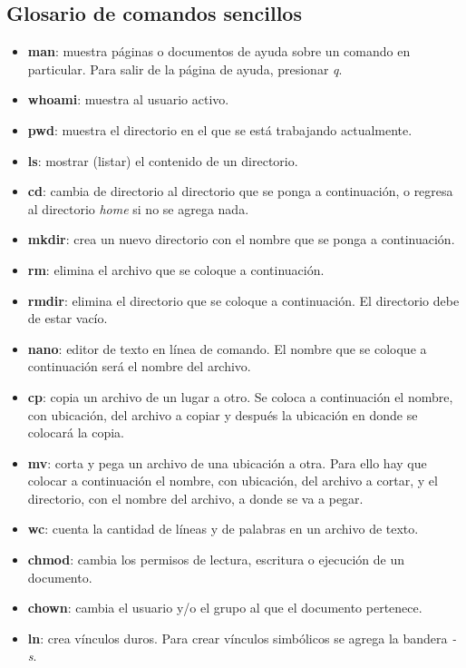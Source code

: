 \documentclass[10pt,letterpaper]{article}
\begin{document}
\subsection{Glosario de comandos sencillos}
\begin{small}

\begin{itemize}
\item \textbf{man}: muestra p\'aginas o documentos de ayuda sobre un comando en particular. Para salir de la p\'agina de ayuda, presionar \emph{q}.
\item \textbf{whoami}: muestra al usuario activo.
\item \textbf{pwd}: muestra el directorio en el que se est\'a trabajando actualmente.
\item \textbf{ls}: mostrar (listar) el contenido de un directorio.
\item \textbf{cd}: cambia de directorio al directorio que se ponga a continuaci\'on, o regresa al directorio \emph{home} si no se agrega nada.
\item \textbf{mkdir}: crea un nuevo directorio con el nombre que se ponga a continuaci\'on.
\item \textbf{rm}: elimina el archivo que se coloque a continuaci\'on.
\item \textbf{rmdir}: elimina el directorio que se coloque a continuaci\'on. El directorio debe de estar vac\'io.
\item \textbf{nano}: editor de texto en l\'inea de comando. El nombre que se coloque a continuaci\'on ser\'a el nombre del archivo.
\item \textbf{cp}: copia un archivo de un lugar a otro. Se coloca a continuaci\'on el nombre, con ubicaci\'on, del archivo a copiar y despu\'es la ubicaci\'on en donde se colocar\'a la copia.
\item \textbf{mv}: corta y pega un archivo de una ubicaci\'on a otra. Para ello hay que colocar a continuaci\'on el nombre, con ubicaci\'on, del archivo a cortar, y el directorio, con el nombre del archivo, a donde se va a pegar.
\item \textbf{wc}: cuenta la cantidad de l\'ineas y de palabras en un archivo de texto.
\item \textbf{chmod}: cambia los permisos de lectura, escritura o ejecuci\'on de un documento.
\item \textbf{chown}: cambia el usuario y/o el grupo al que el documento pertenece.
\item \textbf{ln}: crea v\'inculos duros. Para crear v\'inculos simb\'olicos se agrega la bandera \emph{-s}.

\end{itemize}
\end{small}
\end{document}
